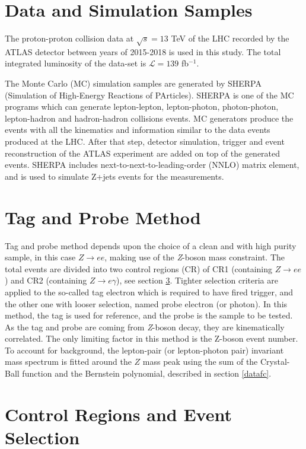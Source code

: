 \section{Data and Simulation Samples}
\label{samples}

The proton-proton collision data at $\sqrt{s}=13$ TeV of the LHC recorded by the ATLAS detector between years of 2015-2018 is used in this study. The total integrated luminosity of the data-set is $\mathcal{L}=139$ fb$^{-1}$.

The Monte Carlo (MC) simulation samples are generated by SHERPA (Simulation of High-Energy Reactions of PArticles). SHERPA is one of the MC programs which can generate lepton-lepton, lepton-photon, photon-photon, lepton-hadron and hadron-hadron collisions events. MC generators produce the events with all the kinematics and information similar to the data events produced at the LHC. After that step, detector simulation, trigger and event reconstruction of the ATLAS experiment are added on top of the generated events. SHERPA includes next-to-next-to-leading-order (NNLO) matrix element, and is used to simulate Z+jets events for the measurements.

\section{Tag and Probe Method}
\label{method}
Tag and probe method depends upon the choice of a clean and with high purity sample, in this case $Z\rightarrow ee$, making use of the \textit{Z}-boson mass constraint. The total events are divided into two control regions (CR) of CR1 (containing $Z\rightarrow ee$) and CR2 (containing $Z\rightarrow e\gamma$), see section \ref{selection}. Tighter selection criteria are applied to the so-called tag electron which is required to have fired trigger, and the other one with looser selection, named probe electron (or photon). In this method, the tag is used for reference, and the probe is the sample to be tested. As the tag and probe are coming from \textit{Z}-boson decay, they are kinematically correlated. The only limiting factor in this method is the Z-boson event number. To account for background, the lepton-pair (or lepton-photon pair) invariant mass spectrum is fitted around the $Z$ mass peak using the sum of the Crystal-Ball function and the Bernstein polynomial, described in section \ref{datafc}.

\section{Control Regions and Event Selection}
\label{selection}

